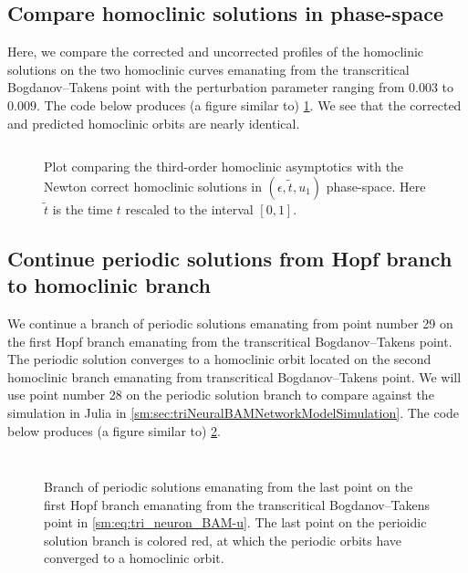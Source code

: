 \subsection{Compare homoclinic solutions in phase-space}
Here, we compare the corrected and uncorrected profiles of the homoclinic
solutions on the two homoclinic curves emanating from the transcritical
Bogdanov--Takens point with the perturbation parameter ranging from $0.003$ to
$0.009$.
The code below produces (a figure similar to)
\cref{sm:fig:triNeuronBAMNeuralNetworkModelCompareOrbitsPhaseSpace}. We see
that the corrected and predicted homoclinic orbits are nearly identical.
\inputminted[firstline=356, lastline=385]{MATLAB}{\pathToDDEBifToolDemos/BAM_neural_network_model/BAMnn.m}
%
\begin{figure}[ht]
    \caption{Plot comparing the third-order homoclinic asymptotics with the
        Newton correct homoclinic solutions in $(\epsilon,\tilde t, u_1)$
        phase-space. Here $\tilde t$ is the time $t$ rescaled to the interval
        $[0,1]$.
    }
    \label{sm:fig:triNeuronBAMNeuralNetworkModelCompareOrbitsPhaseSpace}
\end{figure}

\subsection{Continue periodic solutions from Hopf branch to homoclinic branch}
We continue a branch of periodic solutions emanating from point number 29 on the
first Hopf branch emanating from the transcritical Bogdanov--Takens point. The
periodic solution converges to a homoclinic orbit located on the second
homoclinic branch emanating from transcritical Bogdanov--Takens point. We will
use point number 28 on the periodic solution branch to compare against the
simulation in Julia in \cref{sm:sec:triNeuralBAMNetworkModelSimulation}. The
code below produces (a figure similar to)
\cref{sm:fig:triNeuronBAMNeuralNetworkModelPeriodicSolutions}.
\inputminted[firstline=387, lastline=391]{MATLAB}{\pathToDDEBifToolDemos/BAM_neural_network_model/BAMnn.m}
\vspace*{-12pt}
\inputminted[firstline=398, lastline=414]{MATLAB}{\pathToDDEBifToolDemos/BAM_neural_network_model/BAMnn.m}
\begin{figure}[ht]
    \caption{
        Branch of periodic solutions emanating from the last point on the first
        Hopf branch emanating from the transcritical Bogdanov--Takens point in
        \cref{sm:eq:tri_neuron_BAM-u}. The last point on the perioidic solution
        branch is colored red, at which the periodic orbits have converged to
        a homoclinic orbit.
    }
    \label{sm:fig:triNeuronBAMNeuralNetworkModelPeriodicSolutions}
\end{figure}


